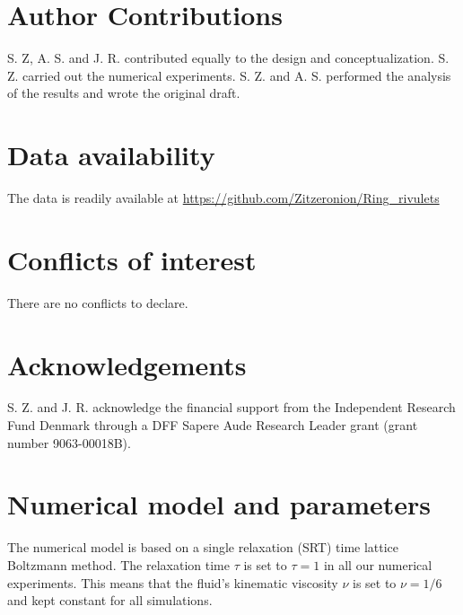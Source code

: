 \documentclass[twoside,twocolumn,9pt]{article}
\renewcommand{\refname}{Notes and references}
\begin{document}
\section*{Author Contributions}
S. Z, A. S. and J. R.  contributed equally to the design and conceptualization. S. Z. carried out the numerical experiments. S. Z. and A. S. performed the analysis of the results and wrote the original draft. 

\section*{Data availability}
The data is readily available at \href{https://github.com/Zitzeronion/Ring_rivulets}{https://github.com/Zitzeronion/Ring\_rivulets}

\section*{Conflicts of interest}
There are no conflicts to declare.

\section*{Acknowledgements}
S. Z. and J. R. acknowledge the financial support from the Independent Research Fund Denmark through a DFF Sapere Aude Research Leader grant (grant number 9063-00018B).





\balance



\appendix
\section{Numerical model and parameters}\label{app:numerics}
The numerical model is based on a single relaxation (SRT) time lattice Boltzmann method. 
The relaxation time $\tau$ is set to $\tau = 1$ in all our numerical experiments. 
This means that the fluid's kinematic viscosity $\nu$ is set to $\nu = 1/6$ and kept constant for all simulations.  
\end{document}
